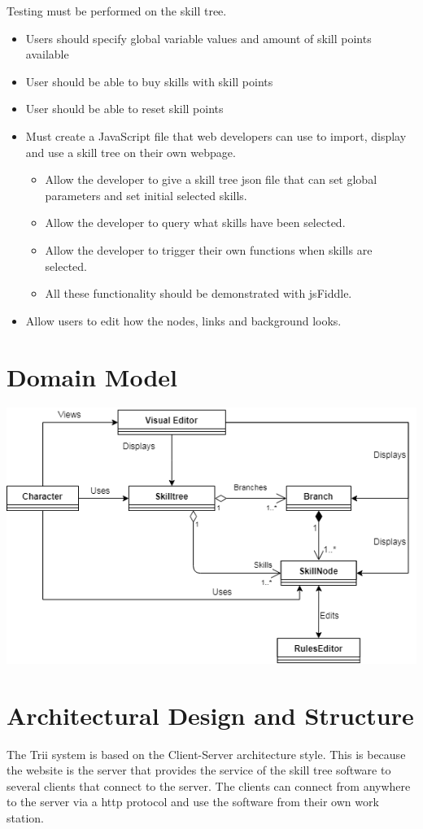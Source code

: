 \documentclass{article}
\begin{document}
Testing must be performed on the skill tree.

\begin{itemize}
\item Users should specify global variable values and amount of skill points available
\item User should be able to buy skills with skill points
\item User should be able to reset skill points
\item Must create a JavaScript file that web developers can use to import, display and use a skill tree on their own webpage.
\begin{itemize}
\item Allow the developer to give a skill tree json file that can set global parameters and set initial selected skills.
\item Allow the developer to query what skills have been selected.
\item Allow the developer to trigger their own functions when skills are selected.
\item All these functionality should be demonstrated with jsFiddle.
\end{itemize}
\item Allow users to edit how the nodes, links and background looks.
\end{itemize}

\section{Domain Model}

\includegraphics{TriiDomainModel}

\section{Architectural Design and Structure}

The Trii system is based on the Client-Server architecture style. This is because the website is the server that provides the service of the skill tree software to several clients that connect to the server. The clients can connect from anywhere to the server via a http protocol and use the software from their own work station.
\end{document}
